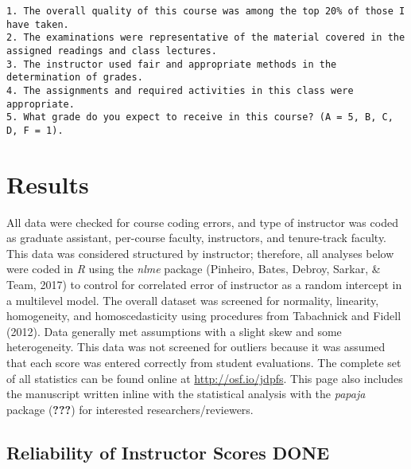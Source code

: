 \documentclass[man]{apa6}
\theoremstyle{definition}
\theoremstyle{definition}
\theoremstyle{definition}
\theoremstyle{remark}
\begin{document}
\begin{verbatim}
1. The overall quality of this course was among the top 20% of those I have taken. 
2. The examinations were representative of the material covered in the assigned readings and class lectures. 
3. The instructor used fair and appropriate methods in the determination of grades. 
4. The assignments and required activities in this class were appropriate. 
5. What grade do you expect to receive in this course? (A = 5, B, C, D, F = 1).
\end{verbatim}

\hypertarget{results}{%
\section{Results}\label{results}}

All data were checked for course coding errors, and type of instructor
was coded as graduate assistant, per-course faculty, instructors, and
tenure-track faculty. This data was considered structured by instructor;
therefore, all analyses below were coded in \emph{R} using the
\emph{nlme} package (Pinheiro, Bates, Debroy, Sarkar, \& Team, 2017) to
control for correlated error of instructor as a random intercept in a
multilevel model. The overall dataset was screened for normality,
linearity, homogeneity, and homoscedasticity using procedures from
Tabachnick and Fidell (2012). Data generally met assumptions with a
slight skew and some heterogeneity. This data was not screened for
outliers because it was assumed that each score was entered correctly
from student evaluations. The complete set of all statistics can be
found online at \url{http://osf.io/jdpfs}. This page also includes the
manuscript written inline with the statistical analysis with the
\emph{papaja} package ({\textbf{???}}) for interested
researchers/reviewers.

\hypertarget{reliability-of-instructor-scores-done}{%
\subsection{Reliability of Instructor Scores
DONE}\label{reliability-of-instructor-scores-done}}
\end{document}
